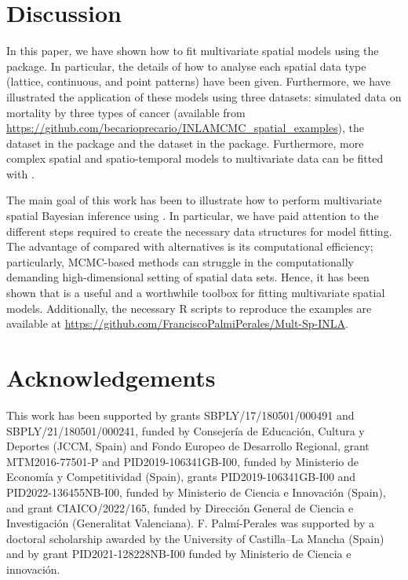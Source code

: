 \section{Discussion}
\label{sec:dis}

\medskip
In this paper, we have shown how to fit multivariate spatial models using the  package. In particular, the details of how to analyse each spatial data type (lattice, continuous, and point patterns) have been given. Furthermore, we have illustrated the application of these models using three datasets: simulated data on mortality by three types of cancer (available from \url{https://github.com/becarioprecario/INLAMCMC_spatial_examples}), the  dataset in the  package and the  dataset in the  package. Furthermore, more complex spatial and spatio-temporal models to multivariate data can be fitted with  \cite[see, for example,][]{INLAMSM}.

\medskip
The main goal of this work has been to illustrate how to perform multivariate spatial Bayesian inference using . In particular, we have paid attention to the different steps required to create the necessary data structures for model fitting. The advantage of  compared with alternatives is its computational efficiency; particularly, MCMC-based methods can struggle in the computationally demanding high-dimensional setting of spatial data sets. Hence, it has been shown that  is a useful and a worthwhile toolbox for fitting multivariate spatial models. Additionally, the necessary R scripts to reproduce the examples are available at \url{https://github.com/FranciscoPalmiPerales/Mult-Sp-INLA}. 


\section{Acknowledgements}

This work has been supported by grants SBPLY/17/180501/000491 and SBPLY/21/180501/000241, funded by Consejer\'ia de Educaci\'on, Cultura y Deportes (JCCM, Spain) and Fondo Europeo de Desarrollo Regional, grant MTM2016-77501-P and PID2019-106341GB-I00, funded by Ministerio de Econom\'ia y Competitividad (Spain), grants PID2019-106341GB-I00 and PID2022-136455NB-I00, funded by Ministerio de Ciencia e Innovaci\'on (Spain), and grant  CIAICO/2022/165, funded by Dirección General de Ciencia e Investigación (Generalitat Valenciana).  F. Palm\'i-Perales was supported by a doctoral scholarship awarded by the University of Castilla–La Mancha (Spain) and by grant PID2021-128228NB-I00 funded by Ministerio de Ciencia e innovaci\'on. 





